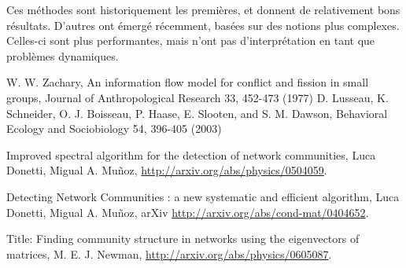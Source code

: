 \documentclass[12pt]{article}
\begin{document}
Ces méthodes sont historiquement les premières, et donnent de relativement bons résultats. D'autres ont émergé récemment, basées
sur des notions plus complexes. Celles-ci sont plus performantes, mais n'ont pas d'interprétation en tant que problèmes dynamiques.

\clearpage
\begin{thebibliography}{2}
 W. W. Zachary, An information flow model for conflict and fission in small groups, Journal of Anthropological Research 33, 452-473 (1977)
 D. Lusseau, K. Schneider, O. J. Boisseau, P. Haase, E. Slooten, and S. M. Dawson, Behavioral Ecology and Sociobiology 54, 396-405 (2003)

 Improved spectral algorithm for the detection of network
 communities, Luca Donetti, Migual A. Mu\~noz, \url{http://arxiv.org/abs/physics/0504059}.

 Detecting Network Communities : a new systematic and
 efficient algorithm, Luca Donetti, Migual A. Mu\~noz, arXiv \url{http://arxiv.org/abs/cond-mat/0404652}.

 Title: Finding community structure in networks using the
 eigenvectors of matrices, M. E. J. Newman,
 \url{http://arxiv.org/abs/physics/0605087}.

\end{thebibliography}
\end{document}
